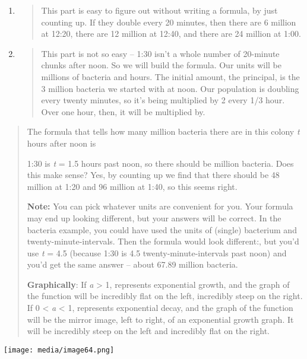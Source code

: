 \begin{enumerate}
\def\labelenumi{\alph{enumi}.}
\item
  \begin{quote}
  This part is easy to figure out without writing a formula, by just
  counting up. If they double every 20 minutes, then there are 6 million
  at 12:20, there are 12 million at 12:40, and there are 24 million at
  1:00.
  \end{quote}
\item
  \begin{quote}
  This part is not so easy -- 1:30 isn't a whole number of 20-minute
  chunks after noon. So we will build the formula. Our units will be
  millions of bacteria and hours. The initial amount, the principal, is
  the 3 million bacteria we started with at noon. Our population is
  doubling every twenty minutes, so it's being multiplied by 2 every 1/3
  hour. Over one hour, then, it will be multiplied by.
  \end{quote}
\end{enumerate}

\begin{quote}
The formula that tells how many million bacteria there are in this
colony \emph{t} hours after noon is

1:30 is \emph{t} = 1.5 hours past noon, so there should be million
bacteria. Does this make sense? Yes, by counting up we find that there
should be 48 million at 1:20 and 96 million at 1:40, so this seems
right.

\textbf{Note:} You can pick whatever units are convenient for you. Your
formula may end up looking different, but your answers will be correct.
In the bacteria example, you could have used the units of (single)
bacterium and twenty-minute-intervals. Then the formula would look
different:, but you'd use \emph{t} = 4.5 (because 1:30 is 4.5
twenty-minute-intervals past noon) and you'd get the same answer --
about 67.89 million bacteria.

\textbf{Graphically}: If \emph{a} \textgreater{} 1, represents
exponential growth, and the graph of the function will be incredibly
flat on the left, incredibly steep on the right. If 0 \textless{}
\emph{a} \textless{} 1, represents exponential decay, and the graph of
the function will be the mirror image, left to right, of an exponential
growth graph. It will be incredibly steep on the left and incredibly
flat on the right.
\end{quote}

\texttt{[image: media/image64.png]}

